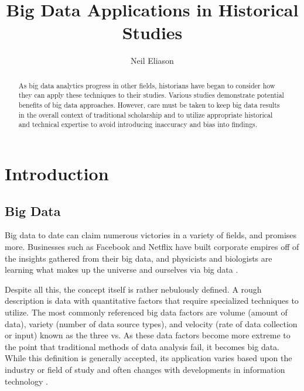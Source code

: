\documentclass[sigconf]{acmart}
\begin{document}
\title{Big Data Applications in Historical Studies}


\author{Neil Eliason}

\renewcommand{\shortauthors}{N. Eliason}


\begin{abstract}

As big data analytics progress in other fields, historians have began to consider how they can apply these techniques to their studies. Various studies demonstrate potential benefits of big data approaches. However, care must be taken to keep big data results in the overall context of traditional scholarship and to utilize appropriate historical and technical expertise to avoid introducing inaccuracy and bias into findings.

\end{abstract}



\maketitle



\section{Introduction}

\subsection{Big Data}


Big data to date can claim numerous victories in a variety of fields, and promises more. Businesses such as Facebook and Netflix have built corporate empires off of the insights gathered from their big data, and physicists and biologists are learning what makes up the universe and ourselves via big data \cite{bdsurvey}. 

Despite all this, the concept itself is rather nebulously defined. A rough description is data with quantitative factors that require specialized techniques to utilize. The most commonly referenced big data factors are volume (amount of data), variety (number of data source types), and velocity (rate of data collection or input) known as the three vs. As these data factors become more extreme to the point that traditional methods of data analysis fail, it becomes big data. While this definition is generally accepted, its application varies based upon the industry or field of study and often changes with developments in information technology \cite{bdconcepts}.
\end{document}
